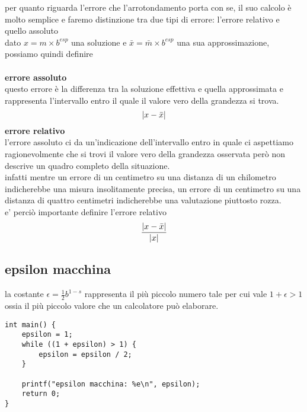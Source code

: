 \documentclass{article}
\begin{document}
per quanto riguarda l'errore che l'arrotondamento porta con se, il suo calcolo è molto semplice e faremo distinzione tra due tipi di errore: l'errore relativo e quello assoluto \\ 
dato $x = m \times b^{esp}$ una soluzione e $\bar{x} = \bar{m} \times b^{esp}$ una sua approssimazione, possiamo quindi definire \\ \\
\large \textbf{errore assoluto}\\
\normalsize questo errore è la differenza tra la soluzione effettiva e quella approssimata e  rappresenta l'intervallo entro il quale il valore vero della grandezza si trova.\\ 
\begin{equation}
  \abs{x-\bar{x}} 
  \label{eq:errore assoluto}
\end{equation}
\large \textbf{errore relativo} \\
\normalsize l'errore assoluto ci da un'indicazione dell'intervallo entro in quale ci aspettiamo ragionevolmente che si trovi il valore vero della grandezza osservata però non descrive un quadro completo della situazione.\\
infatti mentre un errore di un centimetro su una distanza di un chilometro indicherebbe una misura insolitamente precisa, un errore di un centimetro su una distanza di quattro centimetri indicherebbe una valutazione piuttosto rozza.\\ 
e' perciò importante definire l'errore relativo
\begin{equation}
  \displaystyle\frac{\abs{x-\bar{x}}}{\abs{x}}
  \label{eq:errore relativo}
\end{equation}

\subsection{epsilon macchina}
\noindent %
\begin{minipage}{0.6\textwidth} %
la costante $\epsilon = \displaystyle\frac{1 }{2 }b^{1-s}$ rappresenta il più piccolo numero tale per cui vale $1 + \epsilon > 1$ ossia il più piccolo valore che un calcolatore può elaborare.
\end{minipage}
\hfill %
\begin{minipage}{0.35\textwidth} %
\begin{framed}
\begin{lstlisting}
int main() {
    epsilon = 1;
    while ((1 + epsilon) > 1) {
        epsilon = epsilon / 2;
    }

    printf("epsilon macchina: %e\n", epsilon);
    return 0;
}
\end{lstlisting}
\end{framed}
\end{minipage}
\end{document}
